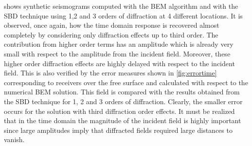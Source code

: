 \documentclass[11pt,letterpaper]{article}
\begin{document}
%
 shows synthetic seismograms computed with the BEM algorithm and with the SBD technique using 1,2 and 3 orders of diffraction at 4 different locations. It is observed, once again, how the time domain response is recovered almost completely by considering only diffraction effects up to third order. The contribution from higher order terms has an amplitude which is already very small with respect to the amplitude from the incident field. Moreover, these higher order diffraction effects are highly delayed with respect to the incident field. This is also verified by the error measures shown in \cref{fig:errortime} corresponding to receivers over the free surface and calculated with respect to the numerical BEM solution. This field is compared with the results obtained from the SBD technique for 1, 2 and 3 orders of diffraction. Clearly, the smaller error occurs for the solution with third diffraction order effects. It must be realized that in the time domain the magnitude of the incident field is highly important since large amplitudes imply that diffracted fields required large distances to vanish.
%
\end{document}
